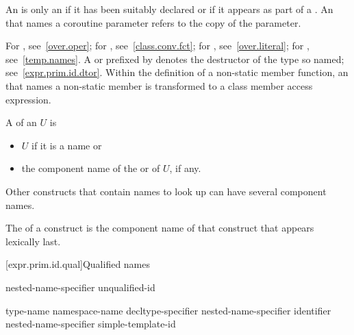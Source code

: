 \documentclass{wg21}
\begin{document}
\pnum
{}%
An  is only
an  if it has
been suitably declared
or if it appears as part of a .
An  that names a coroutine parameter
refers to the copy of the parameter.
\begin{note}
    For , see~\ref{over.oper}; for
    , see~\ref{class.conv.fct}; for
    , see~\ref{over.literal}; for
    , see~\ref{temp.names}.
    A   or 
    prefixed by \tcode{\~} denotes the destructor of the type so named;
    see~\ref{expr.prim.id.dtor}.
    Within the definition of a non-static member function, an
     that names a non-static member is transformed to a
    class member access expression.
\end{note}

\pnum
A  of an  $U$ is
\begin{itemize}
    \item
    $U$ if it is a name or
    \item
    the component name of
    the  or  of $U$, if any.
\end{itemize}
\begin{note}
    Other constructs that contain names to look up can have several
    component names.
\end{note}
The  of a construct is
the component name of that construct that appears lexically last.


[expr.prim.id.qual]{Qualified names}

%
%
%
\begin{bnf}
    \br
    nested-name-specifier  unqualified-id
\end{bnf}

%
%
%
\begin{bnf}
    \br
    \terminal{::}\br
    type-name \terminal{::}\br
    namespace-name \terminal{::}\br
    decltype-specifier \terminal{::}\br
    \br
    nested-name-specifier identifier \terminal{::}\br
    nested-name-specifier  simple-template-id \terminal{::}
\end{bnf}
\end{document}

